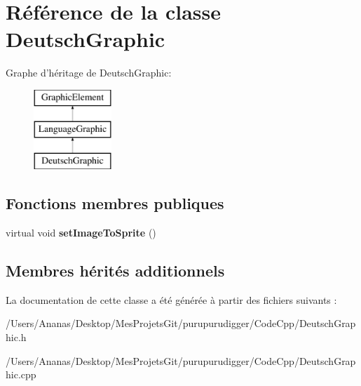 \hypertarget{class_deutsch_graphic}{\section{Référence de la classe Deutsch\-Graphic}
\label{class_deutsch_graphic}
}
Graphe d'héritage de Deutsch\-Graphic\-:\begin{figure}[H]
\begin{center}
\leavevmode
\includegraphics[height=3.000000cm]{class_deutsch_graphic}
\end{center}
\end{figure}
\subsection*{Fonctions membres publiques}
\begin{DoxyCompactItemize}
\item 
\hypertarget{class_deutsch_graphic_a8fb829b3ab050c52fe3a4cdbafc152f0}{virtual void {\bfseries set\-Image\-To\-Sprite} ()}\label{class_deutsch_graphic_a8fb829b3ab050c52fe3a4cdbafc152f0}

\end{DoxyCompactItemize}
\subsection*{Membres hérités additionnels}


La documentation de cette classe a été générée à partir des fichiers suivants \-:\begin{DoxyCompactItemize}
\item 
/\-Users/\-Ananas/\-Desktop/\-Mes\-Projets\-Git/purupurudigger/\-Code\-Cpp/Deutsch\-Graphic.\-h\item 
/\-Users/\-Ananas/\-Desktop/\-Mes\-Projets\-Git/purupurudigger/\-Code\-Cpp/Deutsch\-Graphic.\-cpp\end{DoxyCompactItemize}
